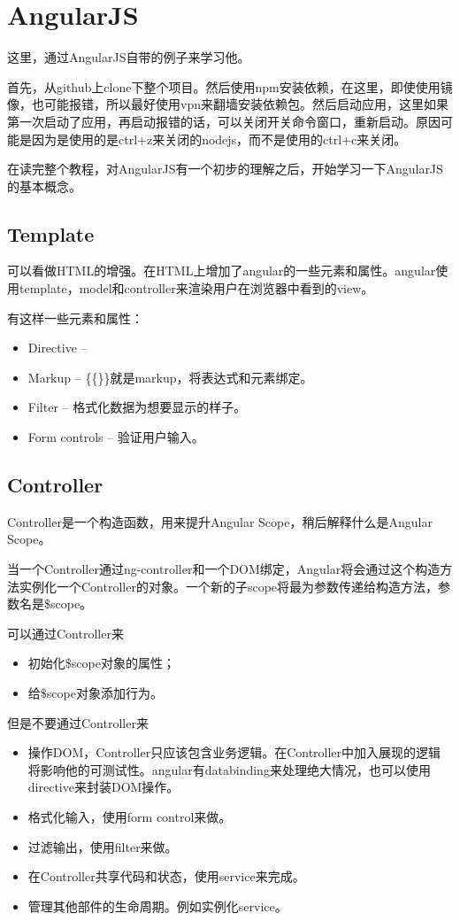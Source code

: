 \section{AngularJS}
  这里，通过AngularJS自带的例子来学习他。

  首先，从github上clone下整个项目。然后使用npm安装依赖，在这里，即使使用镜像，也可能报错，所以最好使用vpn来翻墙安装依赖包。然后启动应用，这里如果第一次启动了应用，再启动报错的话，可以关闭开关命令窗口，重新启动。原因可能是因为是使用的是ctrl+z来关闭的nodejs，而不是使用的ctrl+c来关闭。

  在读完整个教程，对AngularJS有一个初步的理解之后，开始学习一下AngularJS的基本概念。


  \subsection{Template}
  可以看做HTML的增强。在HTML上增加了angular的一些元素和属性。angular使用template，model和controller来渲染用户在浏览器中看到的view。

  有这样一些元素和属性：
  \begin{itemize}
  \item Directive --
  \item Markup -- \{\{\}\}就是markup，将表达式和元素绑定。 
  \item Filter -- 格式化数据为想要显示的样子。
  \item Form controls -- 验证用户输入。
  \end{itemize}


  \subsection{Controller}

  Controller是一个构造函数，用来提升Angular Scope，稍后解释什么是Angular Scope。

  当一个Controller通过ng-controller和一个DOM绑定，Angular将会通过这个构造方法实例化一个Controller的对象。一个新的子scope将最为参数传递给构造方法，参数名是\$scope。

  可以通过Controller来
  \begin{itemize}
  \item 初始化\$scope对象的属性；
  \item 给\$scope对象添加行为。
  \end{itemize}

  但是不要通过Controller来
  \begin{itemize}
  \item 操作DOM，Controller只应该包含业务逻辑。在Controller中加入展现的逻辑将影响他的可测试性。angular有databinding来处理绝大情况，也可以使用directive来封装DOM操作。
  \item 格式化输入，使用form control来做。
  \item 过滤输出，使用filter来做。
  \item 在Controller共享代码和状态，使用service来完成。
  \item 管理其他部件的生命周期。例如实例化service。
  \end{itemize}

